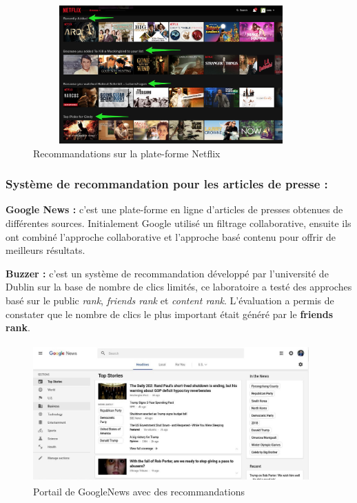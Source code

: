     \begin{figure}[H]
        \centering
            \includegraphics[height=150pt,width=300pt]{img/chapter1/netflix.jpg}
        \caption{Recommandations sur la plate-forme Netflix}
    \end{figure}

\subsubsection*{Système de recommandation pour les articles de presse :} 
\textbf{Google News :} c'est une plate-forme en ligne d'articles de presses obtenues de différentes sources. Initialement Google utilisé un filtrage collaborative, ensuite ils ont combiné l'approche collaborative et l'approche basé contenu pour offrir de meilleurs résultats.\cite{gglnews}


\textbf{Buzzer :} c'est un système de recommandation développé par l'université de Dublin sur la base de nombre de clics limités, ce laboratoire a testé des approches basé sur le public \emph{rank}, \emph{friends rank} et \emph{content rank}. L'évaluation a permis de constater que le nombre de clics le plus important était généré par le \textbf{friends rank}.\cite{gglnews}\\
    \begin{figure}[H]
        \centering
            \includegraphics[height=150pt,width=300pt]{img/chapter1/news.jpg}
        \caption{Portail de GoogleNews avec des recommandations}
    \end{figure}

